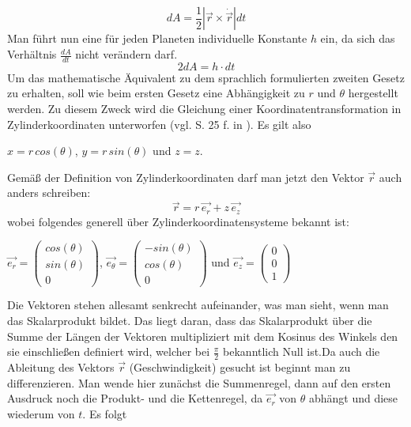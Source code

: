 \begin{equation}
dA = \frac{1}{2}\left| \vec{r} \times \dot{\vec{r}} \right|d t 
\label{equation_dA_kepler}
\end{equation}  
Man führt nun eine für jeden Planeten individuelle Konstante \ensuremath{h} ein, da sich das Verhältnis \ensuremath{\frac{dA}{dt}} nicht verändern darf. 
\begin{equation}
2 dA = h \cdot dt 
\end{equation}  
Um das mathematische Äquivalent zu dem sprachlich formulierten zweiten Gesetz zu erhalten, soll wie beim ersten Gesetz eine Abhängigkeit zu \ensuremath{r} und \ensuremath{\theta} hergestellt werden. Zu diesem Zweck wird die Gleichung einer Koordinatentransformation in Zylinderkoordinaten unterworfen (vgl. S. 25 f. in \cite{Raumflugm}). Es gilt also 
\begin{center}
	\ensuremath{x= r\, cos (\theta)}, \ensuremath{y=r\, sin (\theta)} und \ensuremath{z=z}. 
\end{center}
Gemäß der Definition von Zylinderkoordinaten darf man jetzt den Vektor \ensuremath{\vec{r}} auch anders schreiben:
\begin{equation}
	\vec{r} = r\,\vec{e_{r}} + z\,\vec{e_z}
\end{equation}
wobei folgendes generell über Zylinderkoordinatensysteme bekannt ist:
\begin{center}
	\ensuremath{\vec{e_{r}}=\left(\begin{array}{c}cos(\theta)\\ sin(\theta)\\0\end{array}\right)}, \ensuremath{\vec{e_{\theta}}=\left(\begin{array}{c}-sin(\theta)\\ cos(\theta)\\0\end{array}\right)}  und \ensuremath{\vec{e_z}=\left(\begin{array}{c}0\\0\\1\end{array}\right)}
\end{center}
Die Vektoren stehen allesamt senkrecht aufeinander, was man sieht, wenn man das Skalarprodukt bildet. Das liegt daran, dass das Skalarprodukt über die Summe der Längen der Vektoren multipliziert mit dem Kosinus des Winkels den sie einschließen definiert wird, welcher bei \ensuremath{\frac{\pi}{2}} bekanntlich Null ist.Da auch die Ableitung des Vektors \ensuremath{\vec{r}} (Geschwindigkeit) gesucht ist beginnt man zu differenzieren. Man wende hier zunächst die Summenregel, dann auf den ersten Ausdruck noch die Produkt- und die Kettenregel, da \ensuremath{\vec{e_{r}}} von \ensuremath{\theta} abhängt und diese wiederum von \ensuremath{t}. Es folgt
